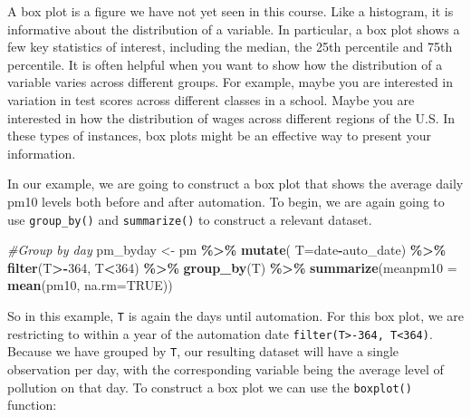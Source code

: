 \documentclass[
]{book}
\newenvironment{Shaded}{\begin{snugshade}}{\end{snugshade}}
\newcommand{\AttributeTok}[1]{\textcolor[rgb]{0.13,0.29,0.53}{#1}}
\newcommand{\CommentTok}[1]{\textcolor[rgb]{0.56,0.35,0.01}{\textit{#1}}}
\newcommand{\ConstantTok}[1]{\textcolor[rgb]{0.56,0.35,0.01}{#1}}
\newcommand{\DecValTok}[1]{\textcolor[rgb]{0.00,0.00,0.81}{#1}}
\newcommand{\FunctionTok}[1]{\textcolor[rgb]{0.13,0.29,0.53}{\textbf{#1}}}
\newcommand{\NormalTok}[1]{#1}
\newcommand{\OtherTok}[1]{\textcolor[rgb]{0.56,0.35,0.01}{#1}}
\newcommand{\SpecialCharTok}[1]{\textcolor[rgb]{0.81,0.36,0.00}{\textbf{#1}}}
\begin{document}
A box plot is a figure we have not yet seen in this course. Like a histogram, it is informative about the distribution of a variable. In particular, a box plot shows a few key statistics of interest, including the median, the 25th percentile and 75th percentile. It is often helpful when you want to show how the distribution of a variable varies across different groups. For example, maybe you are interested in variation in test scores across different classes in a school. Maybe you are interested in how the distribution of wages across different regions of the U.S. In these types of instances, box plots might be an effective way to present your information.

In our example, we are going to construct a box plot that shows the average daily pm10 levels both before and after automation. To begin, we are again going to use \texttt{group\_by()} and \texttt{summarize()} to construct a relevant dataset.

\begin{Shaded}
\begin{Highlighting}[]
\CommentTok{\#Group by day}
\NormalTok{pm\_byday }\OtherTok{\textless{}{-}}\NormalTok{ pm }\SpecialCharTok{\%\textgreater{}\%} 
  \FunctionTok{mutate}\NormalTok{(}
    \AttributeTok{T=}\NormalTok{date}\SpecialCharTok{{-}}\NormalTok{auto\_date) }\SpecialCharTok{\%\textgreater{}\%}
  \FunctionTok{filter}\NormalTok{(T}\SpecialCharTok{\textgreater{}{-}}\DecValTok{364}\NormalTok{, T}\SpecialCharTok{\textless{}}\DecValTok{364}\NormalTok{) }\SpecialCharTok{\%\textgreater{}\%}
  \FunctionTok{group\_by}\NormalTok{(T) }\SpecialCharTok{\%\textgreater{}\%}
  \FunctionTok{summarize}\NormalTok{(}\AttributeTok{meanpm10 =} \FunctionTok{mean}\NormalTok{(pm10, }\AttributeTok{na.rm=}\ConstantTok{TRUE}\NormalTok{))}
\end{Highlighting}
\end{Shaded}

So in this example, \texttt{T} is again the days until automation. For this box plot, we are restricting to within a year of the automation date \texttt{filter(T\textgreater{}-364,\ T\textless{}364)}. Because we have grouped by \texttt{T}, our resulting dataset will have a single observation per day, with the corresponding variable being the average level of pollution on that day. To construct a box plot we can use the \texttt{boxplot()} function:

\begin{Shaded}
\end{Shaded}
\end{document}
